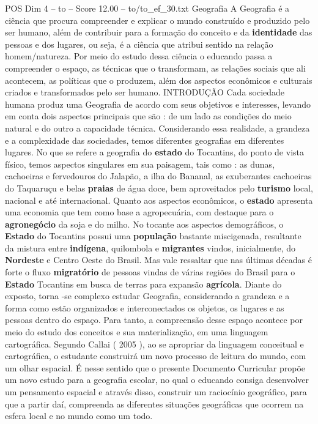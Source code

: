 \begin{textsample}{POS Dim 4 – to – Score 12.00 – to/to\_ef\_30.txt}  \label{ex:f4_pos_202}
Geografia A Geografia é a ciência que procura compreender e explicar o mundo construído e produzido pelo ser humano, além de contribuir para a formação do conceito e da \textbf{identidade} das pessoas e dos lugares, ou seja, é a ciência que atribui sentido na relação homem/natureza.
Por meio do estudo dessa ciência o educando passa a compreender o espaço, as técnicas que o transformam, as relações sociais que ali acontecem, as políticas que o produzem, além dos aspectos econômicos e culturais criados e transformados pelo ser humano.
INTRODUÇÃO Cada sociedade humana produz uma Geografia de acordo com seus objetivos e interesses, levando em conta dois aspectos principais que são : de um lado as condições do meio natural e do outro a capacidade técnica.
Considerando essa realidade, a grandeza e a complexidade das sociedades, temos diferentes geografias em diferentes lugares.
No que se refere a geografia do \textbf{estado} do Tocantins, do ponto de vista físico, temos aspectos singulares em sua paisagem, tais como : as dunas, cachoeiras e fervedouros do Jalapão, a ilha do Bananal, as exuberantes cachoeiras do Taquaruçu e belas \textbf{praias} de água doce, bem aproveitados pelo \textbf{turismo} local, nacional e até internacional.
Quanto aos aspectos econômicos, o \textbf{estado} apresenta uma economia que tem como base a agropecuária, com destaque para o \textbf{agronegócio} da soja e do milho.
No tocante aos aspectos demográficos, o \textbf{Estado} do Tocantins possui uma \textbf{população} bastante miscigenada, resultante da mistura entre \textbf{indígena}, quilombola e \textbf{migrantes} vindos, inicialmente, do \textbf{Nordeste} e Centro Oeste do Brasil.
Mas vale ressaltar que nas últimas décadas é forte o fluxo \textbf{migratório} de pessoas vindas de várias regiões do Brasil para o \textbf{Estado} Tocantins em busca de terras para expansão \textbf{agrícola}.
Diante do exposto, torna -se complexo estudar Geografia, considerando a grandeza e a forma como estão organizados e interconectados os objetos, os lugares e as pessoas dentro do espaço.
Para tanto, a compreensão desse espaço acontece por meio do estudo dos conceitos e sua materialização, em uma linguagem cartográfica.
Segundo Callai ( 2005 ), ao se apropriar da linguagem conceitual e cartográfica, o estudante construirá um novo processo de leitura do mundo, com um olhar espacial.
É nesse sentido que o presente Documento Curricular propõe um novo estudo para a geografia escolar, no qual o educando consiga desenvolver um pensamento espacial e através disso, construir um raciocínio geográfico, para que a partir daí, compreenda as diferentes situações geográficas que ocorrem na esfera local e no mundo como um todo.

\end{textsample}
